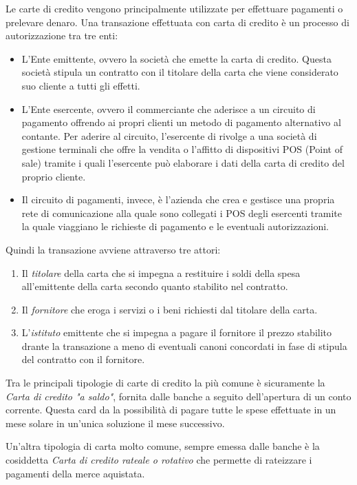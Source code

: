 Le carte di credito vengono principalmente utilizzate per effettuare pagamenti o prelevare denaro. Una transazione effettuata con carta di credito è un processo di autorizzazione tra tre enti:
\begin{itemize}
    \item L'Ente emittente, ovvero la società che emette la carta di credito. Questa società stipula un contratto con il titolare della carta che viene considerato suo cliente a tutti gli effetti.
    \item L'Ente esercente, ovvero il commerciante che aderisce a un circuito di pagamento offrendo ai propri clienti un metodo di pagamento alternativo al contante. Per aderire al circuito, l'esercente di rivolge a una società di gestione terminali che offre la vendita o l'affitto di dispositivi POS (Point of sale) tramite i quali l'esercente può elaborare i dati della carta di credito del proprio cliente.
    \item Il circuito di pagamenti, invece, è l'azienda che crea e gestisce una propria rete di comunicazione alla quale sono collegati i POS degli esercenti tramite la quale viaggiano le richieste di pagamento e le eventuali autorizzazioni.
\end{itemize}
Quindi la transazione avviene attraverso tre attori:
\begin{enumerate}
    \item Il \textit{titolare} della carta che si impegna a restituire i soldi della spesa all'emittente della carta secondo quanto stabilito nel contratto.
    \item Il \textit{fornitore} che eroga i servizi o i beni richiesti dal titolare della carta.
    \item L'\textit{istituto} emittente che si impegna a pagare il fornitore il prezzo stabilito drante la transazione a meno di eventuali canoni concordati in fase di stipula del contratto con il fornitore.
\end{enumerate}

Tra le principali tipologie di carte di credito la più comune è sicuramente la \textit{Carta di credito "a saldo"}, fornita dalle banche a seguito dell'apertura di un conto corrente. Questa card da la possibilità di pagare tutte le spese effettuate in un mese solare in un'unica soluzione il mese successivo.

Un'altra tipologia di carta molto comune, sempre emessa dalle banche è la cosiddetta \textit{Carta di credito rateale o rotativo} che permette di rateizzare i pagamenti della merce aquistata.

